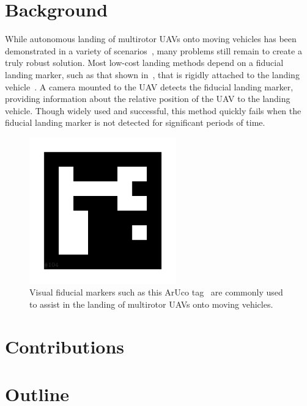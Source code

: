 \section{Background}

While autonomous landing of multirotor UAVs onto moving vehicles has been
demonstrated in a variety of scenarios~\cite{BLAH}, many problems still remain to
create a truly robust solution. Most low-cost landing methods depend on a fiducial
landing marker, such as that shown in~, that is rigidly attached to the landing vehicle~\cite{BLAH}.
A camera mounted to the UAV detects the fiducial landing marker, providing
information about the relative position of the UAV to the landing vehicle.
Though widely used and successful, this method quickly fails when the fiducial
landing marker is not detected for significant periods of time.

\begin{figure}[t]
  \centering
  \includegraphics[width=2.5in]{figures/aruco_104.png}
  \caption[Visual Fiducial Landing Marker]{Visual fiducial markers such as this
    ArUco tag~\cite{garrido2016generation} are commonly used to assist in the
  landing of multirotor UAVs onto moving vehicles.}
  \label{fig:aruco_tag}
\end{figure}

\section{Contributions}

\section{Outline}
